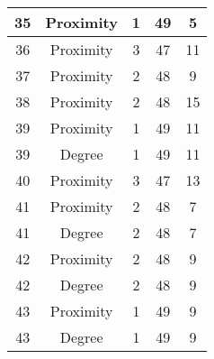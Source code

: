 \documentclass[results.tex]{subfiles}
\begin{document}
\begin{center}
\begin{tabular}{| c || c | c | c | c |}
            \hline
            35                      & Proximity                    & 1                      & 49                      & 5                    \\
            \hline
            36                      & Proximity                    & 3                      & 47                      & 11                   \\
            \hline
            37                      & Proximity                    & 2                      & 48                      & 9                    \\
            \hline
            38                      & Proximity                    & 2                      & 48                      & 15                   \\
            \hline
            39                      & Proximity                    & 1                      & 49                      & 11                   \\
            \hline
            39                      & Degree                       & 1                      & 49                      & 11                   \\
            \hline
            40                      & Proximity                    & 3                      & 47                      & 13                   \\
            \hline
            41                      & Proximity                    & 2                      & 48                      & 7                    \\
            \hline
            41                      & Degree                       & 2                      & 48                      & 7                    \\
            \hline
            42                      & Proximity                    & 2                      & 48                      & 9                    \\
            \hline
            42                      & Degree                       & 2                      & 48                      & 9                    \\
            \hline
            43                      & Proximity                    & 1                      & 49                      & 9                    \\
            \hline
            43                      & Degree                       & 1                      & 49                      & 9                    \\

\end{tabular}
\end{center}
\end{document}
